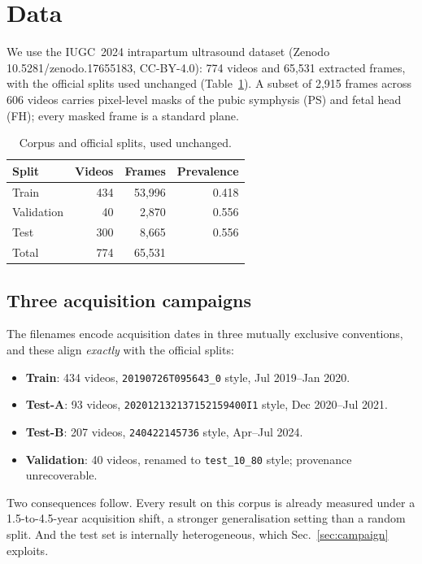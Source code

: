\documentclass[conference]{IEEEtran}
\begin{document}
\section{Data}
\label{sec:data}

We use the IUGC~2024 intrapartum ultrasound dataset (Zenodo
10.5281/zenodo.17655183, CC-BY-4.0): 774 videos and 65{,}531 extracted frames,
with the official splits used unchanged (Table~\ref{tab:data}). A subset of
2{,}915 frames across 606 videos carries pixel-level masks of the pubic
symphysis (PS) and fetal head (FH); every masked frame is a standard plane.

\begin{table}[t]
\caption{Corpus and official splits, used unchanged.}
\label{tab:data}
\centering
\begin{tabular}{lrrr}
\toprule
Split & Videos & Frames & Prevalence \\
\midrule
Train & 434 & 53{,}996 & 0.418 \\
Validation & 40 & 2{,}870 & 0.556 \\
Test & 300 & 8{,}665 & 0.556 \\
\midrule
Total & 774 & 65{,}531 & \\
\bottomrule
\end{tabular}
\end{table}

\subsection{Three acquisition campaigns}
\label{sec:campaigns-data}

The filenames encode acquisition dates in three mutually exclusive
conventions, and these align \emph{exactly} with the official splits:

\begin{itemize}
\item \textbf{Train}: 434 videos, \texttt{20190726T095643\_0} style,
Jul 2019--Jan 2020.
\item \textbf{Test-A}: 93 videos, \texttt{202012132137152159400I1} style,
Dec 2020--Jul 2021.
\item \textbf{Test-B}: 207 videos, \texttt{240422145736} style, Apr--Jul 2024.
\item \textbf{Validation}: 40 videos, renamed to \texttt{test\_10\_80} style;
provenance unrecoverable.
\end{itemize}

Two consequences follow. Every result on this corpus is already measured under
a 1.5-to-4.5-year acquisition shift, a stronger generalisation setting than a
random split. And the test set is internally heterogeneous, which
Sec.~\ref{sec:campaign} exploits.
\end{document}
